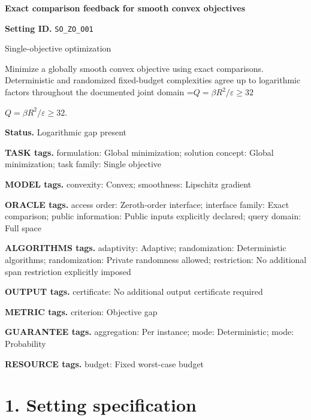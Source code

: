 \documentclass[10pt,a4paper]{article}
\newcommand{\AtlasMath}[1]{\par\begingroup\centering\setbox0=\hbox{$\displaystyle #1$}\ifdim\wd0>1.4\linewidth\typeout{ATLAS WIDE FORMULA: \the\wd0}\fi\ifdim\wd0>\linewidth\resizebox{\linewidth}{!}{\box0}\else\box0\fi\par\endgroup}
\newcommand{\AtlasInlineMath}[1]{\begingroup\setbox0=\hbox{$#1$}\ifdim\wd0>.4\linewidth\endgroup\AtlasMath{#1}\else\endgroup$#1$\fi}
\begin{document}
\raggedright

{\LARGE\bfseries\sffamily\color{AtlasNavy} Exact comparison feedback for smooth convex objectives\par}\vspace{5pt}


\textbf{Setting ID.} \texttt{SO\_\allowbreak{}ZO\_\allowbreak{}O01}



Single-objective optimization



Minimize a globally smooth convex objective using exact comparisons. Deterministic and randomized fixed-budget complexities agree up to logarithmic factors throughout the documented joint domain \AtlasInlineMath{Q=\beta R^2/\varepsilon\ge32}.



\textbf{Status.} Logarithmic gap present



\textbf{TASK tags.} formulation: Global minimization; solution concept: Global minimization; task family: Single objective



\textbf{MODEL tags.} convexity: Convex; smoothness: Lipschitz gradient



\textbf{ORACLE tags.} access order: Zeroth-order interface; interface family: Exact comparison; public information: Public inputs explicitly declared; query domain: Full space



\textbf{ALGORITHMS tags.} adaptivity: Adaptive; randomization: Deterministic algorithms; randomization: Private randomness allowed; restriction: No additional span restriction explicitly imposed



\textbf{OUTPUT tags.} certificate: No additional output certificate required



\textbf{METRIC tags.} criterion: Objective gap



\textbf{GUARANTEE tags.} aggregation: Per instance; mode: Deterministic; mode: Probability



\textbf{RESOURCE tags.} budget: Fixed worst-case budget



\section{1. Setting specification}
\end{document}
